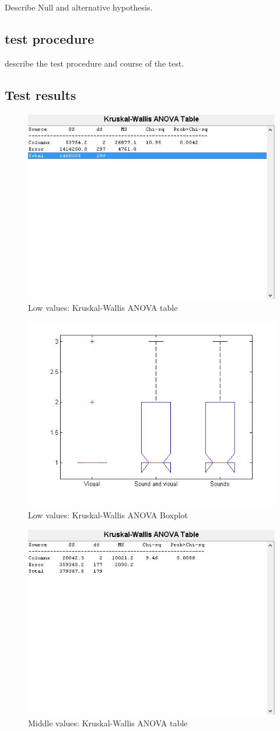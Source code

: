 Describe Null and alternative hypothesis.

\subsection{test procedure}

describe the test procedure and course of the test.

\subsection{Test results}

\begin{figure}[!htbp]
    \centering
    \includegraphics[width=.5\textwidth]{images/tableLow.jpg}
    \caption{Low values: Kruskal-Wallis ANOVA table}
    \label{fig:tableLow}
\end{figure}

\begin{figure}[!htbp]
    \centering
    \includegraphics[width=.5\textwidth]{images/boxplotLow.jpg}
    \caption{Low values: Kruskal-Wallis ANOVA Boxplot}
    \label{fig:boxplotLow}
\end{figure}

\begin{figure}[!htbp]
    \centering
    \includegraphics[width=.5\textwidth]{images/tableMiddle.jpg}
    \caption{Middle values: Kruskal-Wallis ANOVA table}
    \label{fig:tableMiddle}
\end{figure}

